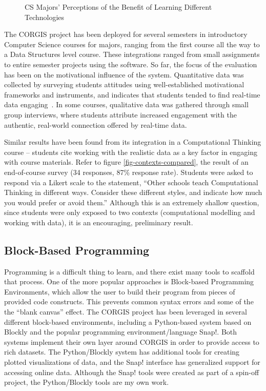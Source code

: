 \begin{figure}
		\begin{center}
		\end{center}
		\caption{CS Majors' Perceptions of the Benefit of Learning Different Technologies}
		\label{fig-expected-benefit}
\end{figure}

The CORGIS project has been deployed for several semesters in introductory Computer Science courses for majors, ranging from the first course all the way to a Data Structures level course.
These integrations ranged from small assignments to entire semester projects using the software.
So far, the focus of the evaluation has been on the motivational influence of the system.
Quantitative data was collected by surveying students attitudes using well-established motivational frameworks and instruments, and indicates that students tended to find real-time data engaging~\cite{realtimeweb}.
In some courses, qualitative data was gathered through small group interviews, where students attribute increased engagement with the authentic, real-world connection offered by real-time data.

Similar results have been found from its integration in a Computational Thinking course -- students cite working with the realistic data as a key factor in engaging with course materials.
Refer to figure \ref{fig-contexts-compared}, the result of an end-of-course survey (34 responses, 87\% response rate).
Students were asked to respond via a Likert scale to the statement, ``Other schools teach Computational Thinking in different ways. Consider these different styles, and indicate how much you would prefer or avoid them.''
Although this is an extremely shallow question, since students were only exposed to two contexts (computational modelling and working with data), it is an encouraging, preliminary result.

\subsection{Block-Based Programming}

Programming is a difficult thing to learn, and there exist many tools to scaffold that process.
One of the more popular approaches is Block-based Programming Environments, which allow the user to build their program from pieces of provided code constructs.
This prevents common syntax errors and some of the the ``blank canvas'' effect.
The CORGIS project has been leveraged in several different block-based environments, including a Python-based system based on Blockly and the popular programming environment/language Snap!. 
Both systems implement their own layer around CORGIS in order to provide access to rich datasets.
The Python/Blockly system has additional tools for creating plotted visualizations of data, and the Snap! interface has generalized support for accessing online data.
Although the Snap! tools were created as part of a spin-off project, the Python/Blockly tools are my own work.

